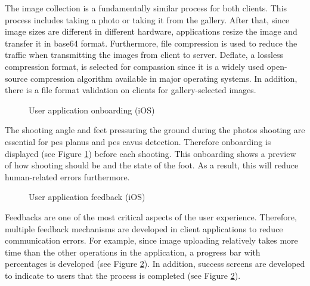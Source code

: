 The image collection is a fundamentally similar process for both clients. This process includes taking a photo or taking it from the gallery. After that, since image sizes are different in different hardware, applications resize the image and transfer it in base64 format. Furthermore, file compression is used to reduce the traffic when transmitting the images from client to server. Deflate, a lossless compression format, is selected for compassion since it is a widely used open-source compression algorithm available in major operating systems. In addition, there is a file format validation on clients for gallery-selected images. 

\begin{figure}[htbp]
\centering
{}
\caption{User application onboarding (iOS)}
\label{fig:UserApplicationOnboarding}
\end{figure}

The shooting angle and feet pressuring the ground during the photos shooting are essential for pes planus and pes cavus detection. Therefore onboarding is displayed (see Figure \ref{fig:UserApplicationOnboarding}) before each shooting. This onboarding shows a preview of how shooting should be and the state of the foot. As a result, this will reduce human-related errors furthermore. 

\begin{figure}[htbp]
\centering
{}
\caption{User application feedback (iOS)}
\label{fig:UserApplicationFeedback}
\end{figure}

Feedbacks are one of the most critical aspects of the user experience. Therefore, multiple feedback mechanisms are developed in client applications to reduce communication errors. For example, since image uploading relatively takes more time than the other operations in the application, a progress bar with percentages is developed (see Figure \ref{fig:UserApplicationFeedback}). In addition, success screens are developed to indicate to users that the process is completed (see Figure \ref{fig:UserApplicationFeedback}).

